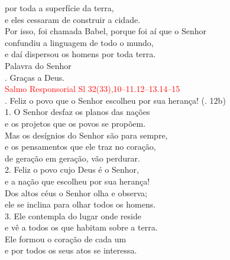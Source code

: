 \documentclass{book}
\begin{document}
\begin{flushleft}
    por toda a superfície da terra, \\
    e eles cessaram de construir a cidade. \\
    Por isso, foi chamada Babel, porque foi aí que o Senhor \\
    confundiu a linguagem de todo o mundo, \\
    e daí dispersou os homens por toda terra.
    \vspace{.1cm} \\
    Palavra do Senhor \\
    {\color{red} \Rbar.} Graças a Deus.
    \vspace{.2cm} \\
    \textcolor{red}{Salmo Responsorial
        \hspace{\fill} Sl 32(33),10--11.12--13.14--15}
    \vspace{.1cm} \\
    {\color{red} \Rbar.} Feliz o povo que o Senhor escolheu por sua herança!
    \hspace{\fill}
    {\color{red} (\Rbar. 12b)}
    \vspace{.1cm} \\
    1. O Senhor desfaz os planos das nações \\
    e os projetos que os povos se propõem. \\
    Mas os desígnios do Senhor são para sempre, \\
    e os pensamentos que ele traz no coração, \\
    de geração em geração, vão perdurar.
    \vspace{.1cm} \\
    2. Feliz o povo cujo Deus é o Senhor, \\
    e a nação que escolheu por sua herança! \\
    Dos altos céus o Senhor olha e observa; \\
    ele se inclina para olhar todos os homens.
    \vspace{.1cm} \\
    3. Ele contempla do lugar onde reside \\
    e vê a todos os que habitam sobre a terra. \\
    Ele formou o coração de cada um \\
    e por todos os seus atos se interessa.

\end{flushleft}
\end{document}
